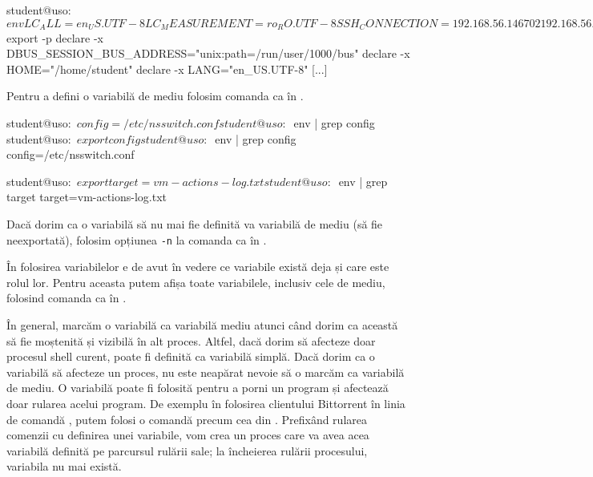 \begin{screen}[caption={Afișarea variabilelor de mediu},label={lst:cli:print-env-vars}]
student@uso:~$ env
LC_ALL=en_US.UTF-8
LC_MEASUREMENT=ro_RO.UTF-8
SSH_CONNECTION=192.168.56.1 46702 192.168.56.101 22
[...]

student@uso:~$ export -p
declare -x DBUS_SESSION_BUS_ADDRESS="unix:path=/run/user/1000/bus"
declare -x HOME="/home/student"
declare -x LANG="en_US.UTF-8"
[...]
\end{screen}

Pentru a defini o variabilă de mediu folosim comanda  ca în .

\begin{screen}[caption={Definirea unei variabile de mediu},label={lst:cli:export}]
student@uso:~$ config=/etc/nsswitch.conf
student@uso:~$ env | grep config
student@uso:~$ export config
student@uso:~$ env | grep config
config=/etc/nsswitch.conf

student@uso:~$ export target=vm-actions-log.txt
student@uso:~$ env | grep target
target=vm-actions-log.txt
\end{screen}

Dacă dorim ca o variabilă să nu mai fie definită va variabilă de mediu (să fie neexportată), folosim opțiunea \texttt{-n} la comanda  ca în .


În folosirea variabilelor e de avut în vedere ce variabile există deja și care este rolul lor.
Pentru aceasta putem afișa toate variabilele, inclusiv cele de mediu, folosind comanda  ca în .

În general, marcăm o variabilă ca variabilă mediu atunci când dorim ca această să fie moștenită și vizibilă în alt proces.
Altfel, dacă dorim să afecteze doar procesul shell curent, poate fi definită ca variabilă simplă.
Dacă dorim ca o variabilă să afecteze un proces, nu este neapărat nevoie să o marcăm ca variabilă de mediu.
O variabilă poate fi folosită pentru a porni un program și afectează doar rularea acelui program.
De exemplu în folosirea clientului Bittorrent în linia de comandă , putem folosi o comandă precum cea din .
Prefixând rularea comenzii cu definirea unei variabile, vom crea un proces care va avea acea variabilă definită pe parcursul rulării sale;
la încheierea rulării procesului, variabila nu mai există.

